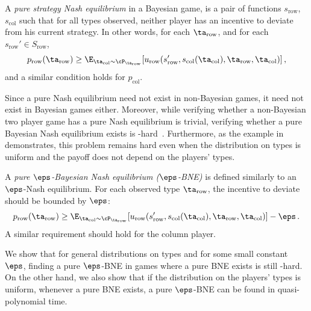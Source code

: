 A \emph{pure strategy Nash equilibrium} in a Bayesian game, is a pair of functions $s_{\mathrm{row}}$, $s_\mathrm{col}$ such that for all types
observed, neither player has an incentive to deviate from his current strategy. In other words, for each $\ta_{\mathrm{row}}$, and 
for each $s_{\mathrm{row}}'\in S_{\mathrm{row}}$, 
$$
p_{\mathrm{row}}(\ta_{\mathrm{row}}) \ge \E_{\ta_\mathrm{col}\sim \cP_{\ta_{\mathrm{row}}}} [u_{\mathrm{row}} ( s_{\mathrm{row}}', s_\mathrm{col}(\ta_\mathrm{col}), \ta_{\mathrm{row}}, \ta_\mathrm{col})]\,,
$$
and a similar condition holds for $p_\mathrm{col}$. 

Since a pure Nash equilibrium need not exist in non-Bayesian games, it
need not exist in Bayesian games either. Moreover, while verifying
whether a non-Bayesian two player game has a pure Nash equilibrium is
trivial, verifying whether a pure Bayesian Nash equilibrium exists is
-hard~\cite{CS08}. Furthermore, as the example in~\cite{CS08}
demonstrates, this problem remains hard even when the distribution on
types is uniform and the payoff does not depend on the players' types.

A \emph{pure  $\eps$-Bayesian Nash equilibrium ($\eps$-BNE)} is defined similarly to an $\eps$-Nash equilibrium. 
For each observed type $\ta_{\mathrm{row}}$, the incentive to deviate should be bounded by $\eps$:
$$
p_{\mathrm{row}}(\ta_{\mathrm{row}}) \ge \E_{\ta_\mathrm{col}\sim \cP_{\ta_{\mathrm{row}}}} [u_{\mathrm{row}} ( s_{\mathrm{row}}', s_\mathrm{col}(\ta_\mathrm{col}), \ta_{\mathrm{row}}, \ta_\mathrm{col})]-\eps\,.
$$
A similar requirement should hold for the column player. 

We show that for general distributions on types and for some small constant $\eps$, finding a pure $\eps$-BNE 
in games where a pure BNE exists is still -hard. On the other hand, we also show that if the distribution on the
players' types is uniform, whenever a pure BNE exists,  a pure $\eps$-BNE can be found in quasi-polynomial time. 
